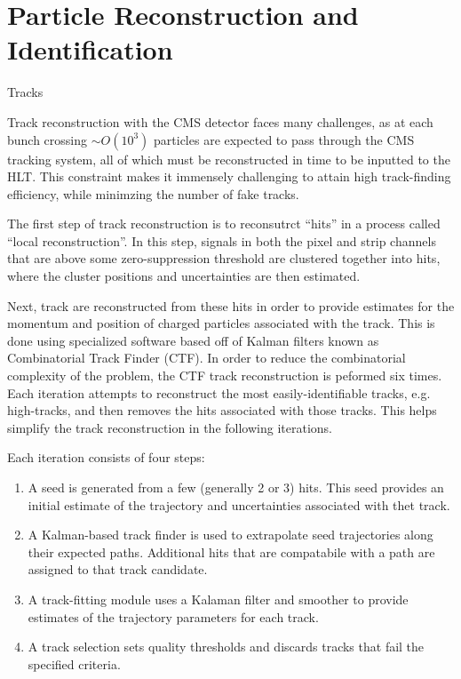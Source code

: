\chapter{Particle Reconstruction and Identification}
\begin{section}{Tracks}

Track reconstruction with the CMS detector faces many challenges, as at each bunch crossing $\sim O(10^3)$ particles are expected to pass through the CMS tracking system, all of which must be reconstructed in time to be inputted to the HLT.
This constraint makes it immensely challenging to attain high track-finding efficiency, while minimzing the number of fake tracks.

The first step of track reconstruction is to reconsutrct ``hits'' in a process called ``local reconstruction''.
In this step, signals in both the pixel and strip channels that are above some zero-suppression threshold are clustered together into hits, where the cluster positions and uncertainties are then estimated.

Next, track are reconstructed from these hits in order to provide estimates for the momentum and position of charged particles associated with the track.
This is done using specialized software based off of Kalman filters known as Combinatorial Track Finder (CTF).
In order to reduce the combinatorial complexity of the problem, the CTF track reconstruction is peformed six times. 
Each iteration attempts to reconstruct the most easily-identifiable tracks, e.g. high-\pT tracks, and then removes the hits associated with those tracks.
This helps simplify the track reconstruction in the following iterations.

Each iteration consists of four steps:
\begin{enumerate}
\item A seed is generated from a few (generally 2 or 3) hits. 
This seed provides an initial estimate of the trajectory and uncertainties associated with thet track.
\item A Kalman-based track finder is used to extrapolate seed trajectories along their expected paths. Additional hits that are compatabile with a path are assigned to that track candidate.
\item A track-fitting module uses a Kalaman filter and smoother to provide estimates of the trajectory parameters for each track.
\item A track selection sets quality thresholds and discards tracks that fail the specified criteria.
\end{enumerate}


\end{section}

